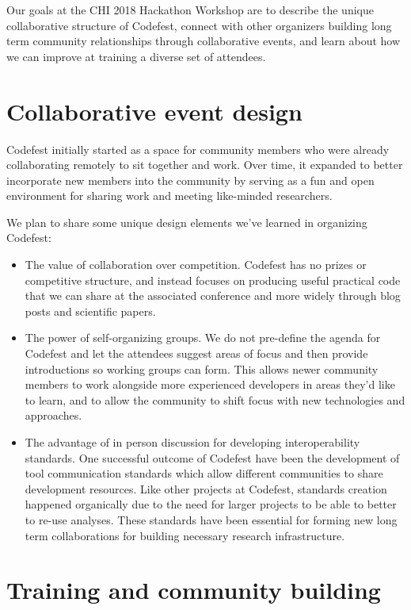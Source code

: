 \documentclass{sigchi-ext}
\begin{document}
Our goals at the CHI 2018 Hackathon Workshop are to describe the unique
collaborative structure of Codefest, connect with other organizers building
long term community relationships through collaborative events, and
learn about how we can improve at training a diverse set of attendees.

\section{Collaborative event design}

Codefest initially started as a space for community members who were already
collaborating remotely to sit together and work. Over time, it expanded to better
incorporate new members into the community by serving as a fun and open
environment for sharing work and meeting like-minded researchers.

We plan to share some unique design elements we've learned in organizing Codefest:

\begin{itemize}
\item The value of collaboration over competition. Codefest has no prizes or
  competitive structure, and instead focuses on producing useful practical code that
  we can share at the associated conference and more widely through blog posts
  and scientific papers.

\item The power of self-organizing groups. We do not pre-define the agenda for
  Codefest and let the attendees suggest areas of focus and then provide
  introductions so working groups can form. This allows newer community members
  to work alongside more experienced developers in areas they'd like to learn,
  and to allow the community to shift focus with new technologies and approaches.

\item The advantage of in person discussion for developing interoperability
  standards. One successful outcome of Codefest have been the development of tool
  communication standards which allow different communities to share development
  resources. Like other projects at Codefest, standards creation happened
  organically due to the need for larger projects to be able to better to re-use
  analyses. These standards have been essential for forming new long term
  collaborations for building necessary research infrastructure.
\end{itemize}

\section{Training and community building}
\end{document}
